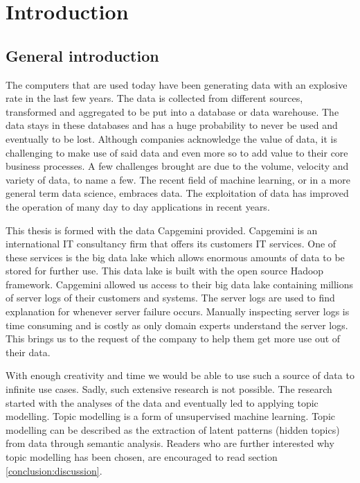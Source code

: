 \chapter{Introduction} \label{ch:introduction}

\section{General introduction}\label{introduction:Generalinformation}
The computers that are used today have been generating data with an explosive rate in the last few years. The data is collected from different sources, transformed and aggregated to be put into a database or data warehouse. The data stays in these databases and has a huge probability to never be used and eventually to be lost. Although companies acknowledge the value of data, it is challenging to make use of said data and even more so to add value to their core business processes. A few challenges brought are due to the volume, velocity and variety of data, to name a few. The recent field of machine learning, or in a more general term data science, embraces data. The exploitation of data has improved the operation of many day to day applications in recent years. 

\setlength{\parindent}{3ex} This thesis is formed with the data Capgemini provided. Capgemini is an international IT consultancy firm that offers its customers IT services. One of these services is the big data lake which allows enormous amounts of data to be stored for further use. This data lake is built with the open source Hadoop framework. Capgemini allowed us access to their big data lake containing millions of server logs of their customers and systems. The server logs are used to find explanation for whenever server failure occurs. Manually inspecting server logs is time consuming and is costly as only domain experts understand the server logs. This brings us to the request of the company to help them get more use out of their data. 

With enough creativity and time we would be able to use such a source of data to infinite use cases. Sadly, such extensive research is not possible. The research started with the analyses of the data and eventually led to applying topic modelling. Topic modelling is a form of unsupervised machine learning. Topic modelling can be described as the extraction of latent patterns (hidden topics) from data through semantic analysis. Readers who are further interested why topic modelling has been chosen, are encouraged to read section \ref{conclusion:discussion}. 

